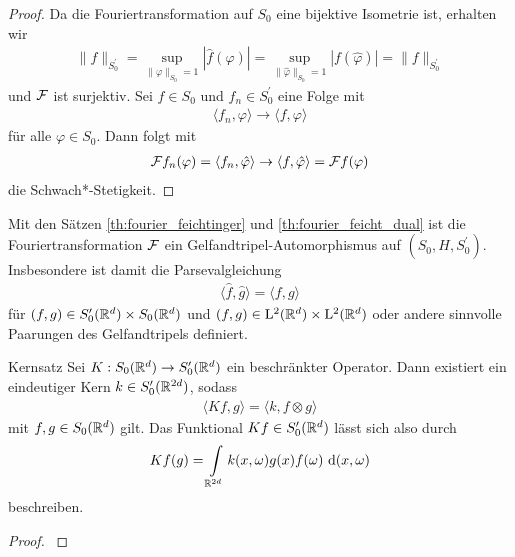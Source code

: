 \begin{proof}
	Da die Fouriertransformation auf $ S_0 $ eine bijektive Isometrie ist, erhalten wir
	\begin{align*}
	\|f \|_{S_0^\prime}
	= 
	\sup \limits_{\| \varphi \|_{S_0} = 1} |\hat{f}(\varphi) |
	=
	\sup \limits_{\| \hat{\varphi} \|_{S_0} = 1} |f(\hat{\varphi}) |
	= 
	\| f \|_{S_0^\prime}
	\end{align*}
	und $ \mathcal{F} $ ist surjektiv.
	Sei $ f \in S_0 $ und $ f_n \in S_0^\prime $ eine Folge mit
	\begin{align*}
	\langle f_n ,\varphi \rangle \to \langle f,\varphi \rangle
	\end{align*}
	für alle $ \varphi \in S_0 $.
	Dann folgt mit
	\begin{align*}
	\mathcal{F} f_n(\varphi)
	= \langle f_n , \hat{\varphi} \rangle
	\to 
	\langle f , \hat{\varphi} \rangle
	= \mathcal{F} f (\varphi)
	\end{align*}
	die Schwach*-Stetigkeit.
\end{proof}

Mit den Sätzen \ref{th:fourier_feichtinger} und \ref{th:fourier_feicht_dual} ist die Fouriertransformation $ \mathcal{F} $ ein Gelfandtripel-Automorphismus auf $ (S_0, H, S_0^\prime) $.
Insbesondere ist damit die Parsevalgleichung 
\begin{align}
\langle \hat{f},\hat{g} \rangle
=
\langle f, g \rangle
\end{align}
für  $ (f,g) \in S_0^\prime(\mathbb{R}^d) \times S_0(\mathbb{R}^d)  $ und $ (f,g) \in \mathrm{L}^2(\mathbb{R}^d) \times \mathrm{L}^2(\mathbb{R}^d) $ oder andere sinnvolle Paarungen des Gelfandtripels definiert.






\begin{genericthm}{Kernsatz}
	Sei $ K : S_0(\mathbb{R}^d) \to S_0^\prime(\mathbb{R}^d) $ ein beschränkter Operator.
	Dann existiert ein eindeutiger Kern $ k \in S_0^\prime(\mathbb{R}^{2d}) $, sodass 
	\begin{align}
	\langle K f, g \rangle 
	=
	\langle k , f \otimes g \rangle
	\end{align}
	mit $ f,g \in S_0(\mathbb{R}^d) $ gilt. Das Funktional $ Kf \in S_0^\prime(\mathbb{R}^d) $ lässt sich also durch
	\begin{align}
	Kf(g)
	= 
	\int \limits_{\mathbb{R}^{2d}} k(x,\omega)  g(x) f(\omega) \text{ d} (x,\omega)
	\end{align}
	beschreiben.
\end{genericthm}

\begin{proof}
	\cite[Abschnitt~14.4]{noauthor2009Foundationsof}
\end{proof}